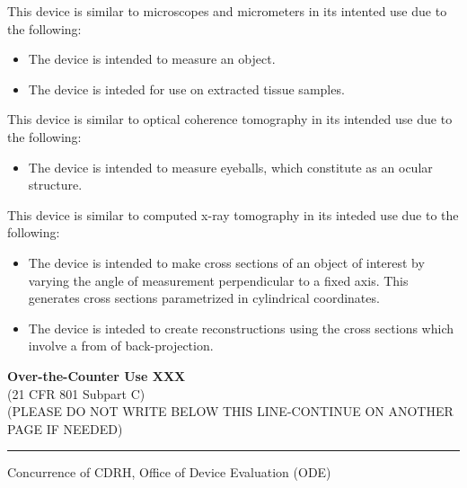 \onehalfspacing

This device is similar to microscopes and micrometers in its intented
use due to the following:
\begin{itemize}
\item The device is intended to measure an object.
\item The device is inteded for use on extracted tissue samples. \\
\end{itemize}

This device is similar to optical coherence tomography in its intended
use due to the following:
\begin{itemize}
\item The device is intended to measure eyeballs, which constitute as
  an ocular structure. \\
\end{itemize}

This device is similar to computed x-ray tomography in its inteded use
due to the following:
\begin{itemize}
\item The device is intended to make cross sections of an object of
  interest by varying the angle of measurement perpendicular to a
  fixed axis. This generates cross sections parametrized in
  cylindrical coordinates.
\item The device is inteded to create reconstructions using the cross
  sections which involve a from of back-projection. 
\end{itemize}

\vfill

\noindent \textbf{Over-the-Counter Use XXX} \\
(21 CFR 801 Subpart C)\\[1em]

\noindent (PLEASE DO NOT WRITE BELOW THIS LINE-CONTINUE ON ANOTHER PAGE IF
NEEDED)

\rule{\linewidth}{0.5mm}
\begin{center}
  Concurrence of CDRH, Office of Device Evaluation (ODE)
\end{center}

\vspace{5em}


